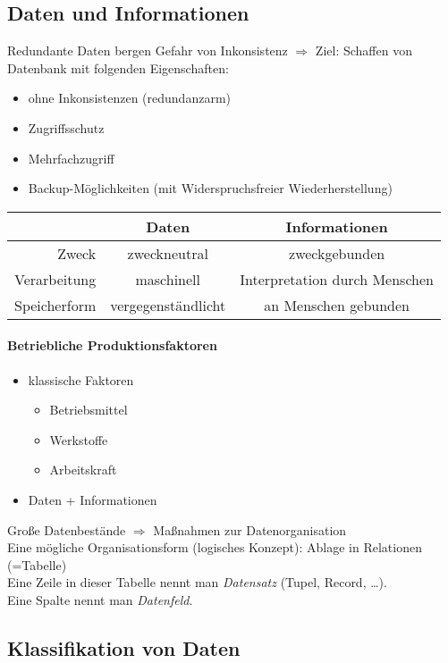 \subsection{Daten und Informationen}
Redundante Daten bergen Gefahr von Inkonsistenz $\Rightarrow$ Ziel: Schaffen von Datenbank mit folgenden Eigenschaften:
\begin{itemize}
\item ohne Inkonsistenzen (redundanzarm)
\item Zugriffsschutz
\item Mehrfachzugriff
\item Backup-Möglichkeiten (mit Widerspruchsfreier Wiederherstellung)
\end{itemize}

\begin{tabular}{r | c c}
& Daten & Informationen\\
\hline
Zweck & zweckneutral & zweckgebunden\\
Verarbeitung & maschinell & Interpretation durch Menschen\\
Speicherform & vergegenständlicht & an Menschen gebunden\\
\end{tabular}
\paragraph{Betriebliche Produktionsfaktoren}
\begin{itemize}
\item klassische Faktoren
\begin{itemize}
\item Betriebsmittel
\item Werkstoffe
\item Arbeitskraft
\end{itemize}
\item Daten + Informationen
\end{itemize}

Große Datenbestände $\Rightarrow$ Maßnahmen zur Datenorganisation\bigskip\\
Eine mögliche Organisationsform (logisches Konzept): Ablage in Relationen (=Tabelle)\bigskip\\
Eine Zeile in dieser Tabelle nennt man \emph{Datensatz} (Tupel, Record, …).\\
Eine Spalte nennt man \emph{Datenfeld}.

\subsection{Klassifikation von Daten}
